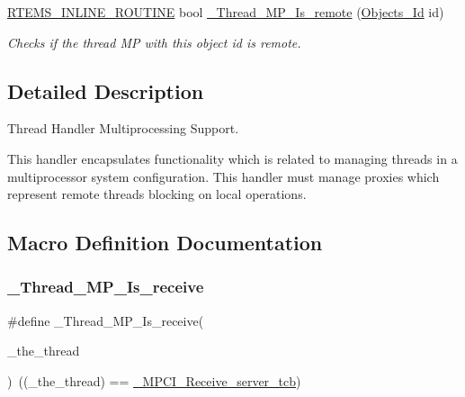 \begin{DoxyCompactItemize}
\mbox{\hyperlink{group__RTEMSScoreBaseDefs_gac216239df231d5dbd15e3520b0b9313f}{R\+T\+E\+M\+S\+\_\+\+I\+N\+L\+I\+N\+E\+\_\+\+R\+O\+U\+T\+I\+NE}} bool \mbox{\hyperlink{group__RTEMSScoreThreadMP_ga8c8c9e4dadd94632600e764d4e85ee89}{\+\_\+\+Thread\+\_\+\+M\+P\+\_\+\+Is\+\_\+remote}} (\mbox{\hyperlink{group__RTEMSScoreObject_ga5821f52a51072941bdd603e542d0863e}{Objects\+\_\+\+Id}} id)
\begin{DoxyCompactList}\small\item\em Checks if the thread MP with this object id is remote. \end{DoxyCompactList}\end{DoxyCompactItemize}


\subsection{Detailed Description}
Thread Handler Multiprocessing Support. 

This handler encapsulates functionality which is related to managing threads in a multiprocessor system configuration. This handler must manage proxies which represent remote threads blocking on local operations. 

\subsection{Macro Definition Documentation}
\mbox{\label{group__RTEMSScoreThreadMP_ga3e52b743b9616035b9c92ba4f0f37924}} 
\subsubsection{\texorpdfstring{\_Thread\_MP\_Is\_receive}{\_Thread\_MP\_Is\_receive}}
{\footnotesize\ttfamily \#define \+\_\+\+Thread\+\_\+\+M\+P\+\_\+\+Is\+\_\+receive(\begin{DoxyParamCaption}\item[{}]{\+\_\+the\+\_\+thread }\end{DoxyParamCaption})~((\+\_\+the\+\_\+thread) == \mbox{\hyperlink{group__RTEMSScoreMPCI_gac0894f96d2d7e99feb038917fdb3c9cb}{\+\_\+\+M\+P\+C\+I\+\_\+\+Receive\+\_\+server\+\_\+tcb}})}

